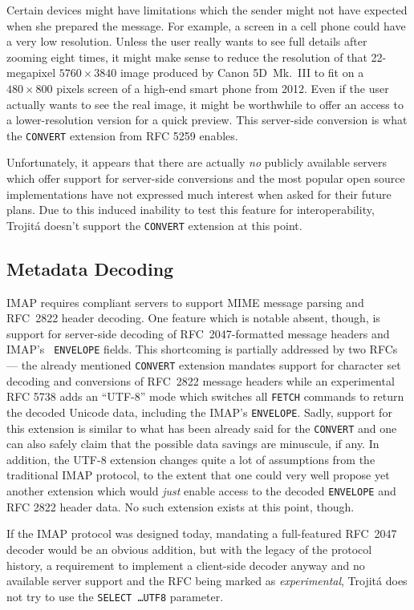 \documentclass[trojita]{subfiles}
\begin{document}
Certain devices might have limitations which the sender might not have expected when she prepared the message.  For
example, a screen in a cell phone could have a very low resolution.  Unless the user really wants to see full details
after zooming eight times, it might make sense to reduce the resolution of that 22-megapixel $5760 \times 3840$ image
produced by Canon 5D~Mk.~III to fit on a $480 \times 800$ pixels screen of a high-end smart phone from 2012.  Even if
the user actually wants to see the real image, it might be worthwhile to offer an access to a lower-resolution version
for a quick preview.  This server-side conversion is what the {\tt CONVERT} extension from RFC 5259 \cite{rfc5259} enables.

Unfortunately, it appears that there are actually {\em no} publicly available servers which offer support for
server-side conversions and the most popular open source implementations have not expressed much interest when asked for
their future plans.  Due to this induced inability to test this feature for interoperability, Trojitá doesn't support
the {\tt CONVERT} extension at this point.

\subsection{Metadata Decoding}

IMAP requires compliant servers to support MIME message parsing and RFC~2822 header decoding.  One feature which is
notable absent, though, is support for server-side decoding of RFC~2047-formatted message headers and IMAP's {\tt
ENVELOPE} fields.  This shortcoming is partially addressed by two RFCs --- the already mentioned {\tt CONVERT} extension
mandates support for character set decoding and conversions of RFC~2822 message headers while an experimental RFC 5738
\cite{rfc5738} adds an ``UTF-8'' mode which switches all {\tt FETCH} commands to return the decoded Unicode data,
including the IMAP's {\tt ENVELOPE}.  Sadly, support for this extension is similar to what has been already said for the
{\tt CONVERT} and one can also safely claim that the possible data savings are minuscule, if any.  In addition, the
UTF-8 extension changes quite a lot of assumptions from the traditional IMAP protocol, to the extent that one could very
well propose yet another extension which would {\em just} enable access to the decoded {\tt ENVELOPE} and RFC 2822
header data.  No such extension exists at this point, though.

If the IMAP protocol was designed today, mandating a full-featured RFC~2047 decoder would be an obvious addition, but
with the legacy of the protocol history, a requirement to implement a client-side decoder anyway and no available server
support and the RFC being marked as {\em experimental}, Trojitá does not try to use the {\tt SELECT \ldots UTF8}
parameter.
\end{document}
